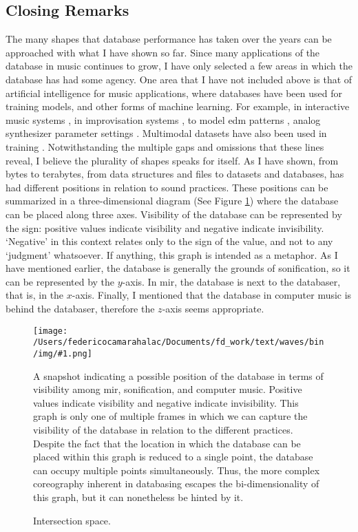 \documentclass[
]{book}
\newcommand{\fsee}[1]{(See Figure \ref{img:#1})}
\newcommand{\img}[4]{
\begin{figure}[!htbp]
\centering
\texttt{[image: /Users/federicocamarahalac/Documents/fd\_work/text/waves/bin/img/\#1.png]}
\caption{#4}
\label{img:#1}
#3
\end{figure}
\FloatBarrier
}
\begin{document}
\subsection{Closing Remarks}
The many shapes that database performance has taken over the years can be approached with what I have shown so far. Since many applications of the database in music continues to grow, I have only selected a few areas in which the database has had some agency. One area that I have not included above is that of artificial intelligence for music applications, where databases have been used for training models, and other forms of machine learning. For example, in interactive music systems \parencite{Row92:Int}, in improvisation systems \parencites{DBLP:conf/icmc/AssayagDD99}{DBLP:conf/icmc/BlochD08}, to model \gls{edm} patterns \parencite{rvogl:2017}, analog synthesizer parameter settings \parencite{Loviscach2008}. Multimodal datasets have also been used in training \parencite{DBLP:conf/icmc/SchonerCDG98}. Notwithstanding the multiple gaps and omissions that these lines reveal, I believe the plurality of shapes speaks for itself. As I have shown, from bytes to terabytes, from data structures and files to datasets and databases, has had different positions in relation to sound practices. These positions can be summarized in a three-dimensional diagram \fsee{intersections} where the database can be placed along three axes. Visibility of the database can be represented by the sign: positive values indicate visibility and negative indicate invisibility. `Negative' in this context relates only to the sign of the value, and not to any `judgment' whatsoever. If anything, this graph is intended as a metaphor. As I have mentioned earlier, the database is generally the grounds of sonification, so it can be represented by the $y$-axis. In \gls{mir}, the database is next to the databaser, that is, in the $x$-axis. Finally, I mentioned that the database in computer music is behind the databaser, therefore the $z$-axis seems appropriate.

\img{intersections}{0.5}{
	A snapshot indicating a possible position of the database in terms of visibility among \gls{mir}, sonification, and computer music. Positive values indicate visibility and negative indicate invisibility. This graph is only one of multiple frames in which we can capture the visibility of the database in relation to the different practices. Despite the fact that the location in which the database can be placed within this graph is reduced to a single point, the database can occupy multiple points simultaneously. Thus, the more complex coreography inherent in databasing escapes the bi-dimensionality of this graph, but it can nonetheless be hinted by it.
}{Intersection space.}
\end{document}
